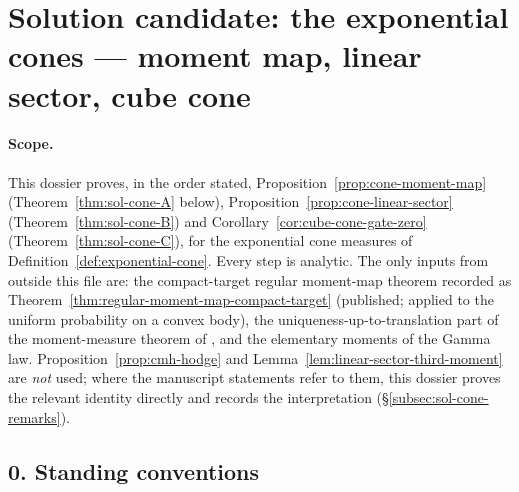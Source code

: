 \documentclass[../main.tex]{subfiles}
\begin{document}
%
\section*{Solution candidate: the exponential cones --- moment map, linear sector, cube cone}
\label{sec:sol-cone-moment-map}

\paragraph{Scope.}
This dossier proves, in the order stated, Proposition~\ref{prop:cone-moment-map}
(Theorem~\ref{thm:sol-cone-A} below), Proposition~\ref{prop:cone-linear-sector}
(Theorem~\ref{thm:sol-cone-B}) and Corollary~\ref{cor:cube-cone-gate-zero}
(Theorem~\ref{thm:sol-cone-C}), for the exponential cone measures of
Definition~\ref{def:exponential-cone}.  Every step is analytic.  The only inputs from outside
this file are: the compact-target regular moment-map theorem recorded as
Theorem~\ref{thm:regular-moment-map-compact-target} (published; applied to the uniform
probability on a convex body), the uniqueness-up-to-translation part of the moment-measure
theorem of \cite{CorderoErausquinKlartag2015MomentMeasures}, and the elementary moments of the
Gamma law.  Proposition~\ref{prop:cmh-hodge} and Lemma~\ref{lem:linear-sector-third-moment}
are \emph{not} used; where the manuscript statements refer to them, this dossier proves the
relevant identity directly and records the interpretation (\S\ref{subsec:sol-cone-remarks}).

\subsection*{0. Standing conventions}
\label{subsec:sol-cone-conventions}
\end{document}
